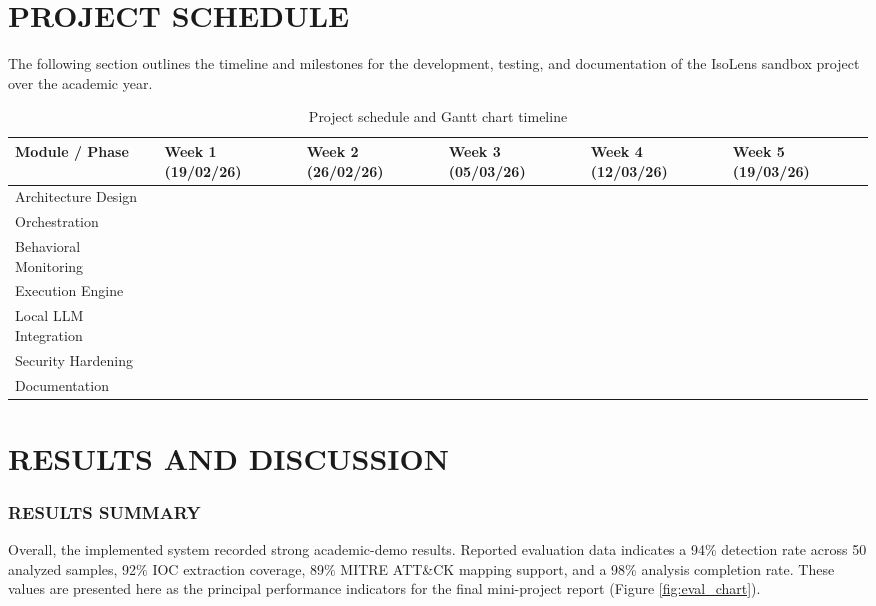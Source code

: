 \documentclass[a4paper,12pt,oneside]{report}
\begin{document}
\chapter{PROJECT SCHEDULE}
The following section outlines the timeline and milestones for the development, testing, and documentation of the IsoLens sandbox project over the academic year.

\begin{table}[H]
\centering
\caption{Project schedule and Gantt chart timeline}
\label{tab:project_schedule}
\renewcommand{\arraystretch}{1.5}
\setlength{\tabcolsep}{3pt}
\begin{tabularx}{\textwidth}{>{\raggedright\arraybackslash}X >{\centering\arraybackslash}p{2cm} >{\centering\arraybackslash}p{2cm} >{\centering\arraybackslash}p{2cm} >{\centering\arraybackslash}p{2cm} >{\centering\arraybackslash}p{2cm}}
\toprule
\rowcolor{black!10}
\textbf{Module / Phase} & \textbf{Week 1 \newline(19/02/26)} & \textbf{Week 2 \newline(26/02/26)} & \textbf{Week 3 \newline(05/03/26)} & \textbf{Week 4 \newline(12/03/26)} & \textbf{Week 5 \newline(19/03/26)} \\
\midrule
Architecture Design & \cellcolor{black!70} & & & & \\
Orchestration & \cellcolor{black!70} & \cellcolor{black!70} & & & \\
Behavioral Monitoring & & \cellcolor{black!70} & \cellcolor{black!70} & & \\
Execution Engine & & & \cellcolor{black!70} & & \\
Local LLM Integration & & & & \cellcolor{black!70} & \\
Security Hardening & & & & \cellcolor{black!70} & \cellcolor{black!70} \\
Documentation & & & & & \cellcolor{black!70} \\
\bottomrule
\end{tabularx}
\end{table}


\chapter{RESULTS AND DISCUSSION}
\subsection{RESULTS SUMMARY}
Overall, the implemented system recorded strong academic-demo results. Reported evaluation data indicates a 94\% detection rate across 50 analyzed samples, 92\% IOC extraction coverage, 89\% MITRE ATT\&CK mapping support, and a 98\% analysis completion rate. These values are presented here as the principal performance indicators for the final mini-project report (Figure \ref{fig:eval_chart}).
\end{document}
